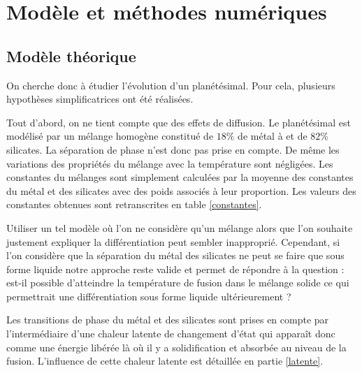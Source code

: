 \documentclass[10pt,a4paper]{article}
\numberwithin{equation}{section}
\begin{document}
\section{Modèle et méthodes numériques}
\subsection{Modèle théorique}

On cherche donc à étudier l'évolution d'un planétésimal. Pour cela, plusieurs hypothèses simplificatrices ont été réalisées. 
\medskip

Tout d'abord, on ne tient compte que des effets de diffusion. Le planétésimal est modélisé par un mélange homogène constitué de $18\%$ de métal à et de $82\%$ silicates. La séparation de phase n'est donc pas prise en compte. De même les variations des propriétés du mélange avec la température sont négligées. Les constantes du mélanges sont simplement calculées par la moyenne des constantes du métal et des silicates avec des poids associés à leur proportion. Les valeurs des constantes obtenues sont retranscrites en table \ref{constantes}.
\medskip

Utiliser un tel modèle où l'on ne considère qu'un mélange alors que l'on souhaite justement expliquer la différentiation peut sembler inapproprié. Cependant, si l'on considère que la séparation du métal des silicates ne peut se faire que sous forme liquide notre approche reste valide et permet de répondre à la question : est-il possible d'atteindre la température de fusion dans le mélange solide ce qui permettrait une différentiation sous forme liquide ultérieurement ? 
\medskip

Les transitions de phase du métal et des silicates sont prises en compte par l'intermédiaire d'une chaleur latente de changement d'état qui apparaît donc comme une énergie libérée là où il y a solidification et absorbée au niveau de la fusion. L'influence de cette chaleur latente est détaillée en partie \ref{latente}.
\end{document}
